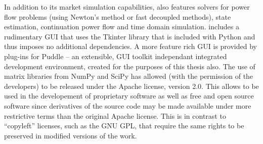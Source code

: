 In addition to its market simulation capabilities, \pylon also features solvers
for power flow problems (using Newton's method or fast decoupled methods),
state estimation, continuation power flow and time domain simulation.  \pylon
includes a rudimentary GUI that uses the Tkinter library that is included
with Python and thus imposes no additional dependencies.  A more feature
rich GUI is provided by plug-ins for Puddle -- an extensible, GUI
toolkit independant integrated development environment, created for the
purposes of this thesis also.  The use of matrix libraries from NumPy and
SciPy has allowed \pylon (with the permission of the \matpower developers) to
be released under the Apache license, version 2.0. This allows \pylon to be
used in the developement of proprietary software as well as free and open
source software since derivatives of the source code may be made available
under more restrictive terms than the original Apache license.  This is in
contrast to ``copyleft'' licenses, such as the GNU GPL, that require the same
rights to be preserved in modified versions of the work.



